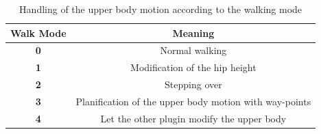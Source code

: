 \begin{table}
\begin{tabular}{|c|c|} \hline
Walk Mode & Meaning \\ \hline \hline
{\bf 0} & Normal walking \\
{\bf 1} & Modification of the hip height \\
{\bf 2} & Stepping over \\
{\bf 3} & Planification of the upper body motion with way-points \\
{\bf 4} & Let the other plugin modify the upper body \\ \hline 
\end{tabular}
\caption{Handling of the upper body motion according to the walking mode}
\end{table}
